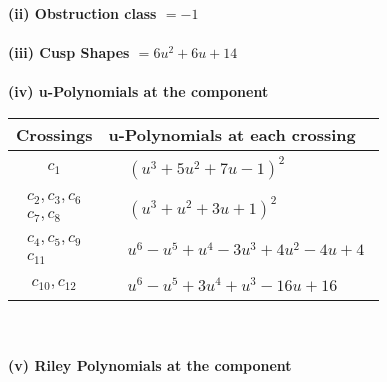 \documentclass[1p]{elsarticle_modified}
\theoremstyle{definition}
\begin{document}
\flushleft \textbf{(ii) Obstruction class $= -1$}\\~\\
\flushleft \textbf{(iii) Cusp Shapes $= 6 u^2+6 u+14$}\\~\\
\newpage\renewcommand{\arraystretch}{1}
\flushleft \textbf{(iv) u-Polynomials at the component}\newline \\
\begin{tabular}{m{50pt}|m{274pt}}
Crossings & \hspace{64pt}u-Polynomials at each crossing \\
\hline $$\begin{aligned}c_{1}\end{aligned}$$&$\begin{aligned}
&(u^3+5 u^2+7 u-1)^2
\end{aligned}$\\
\hline $$\begin{aligned}c_{2},c_{3},c_{6}\\c_{7},c_{8}\end{aligned}$$&$\begin{aligned}
&(u^3+u^2+3 u+1)^2
\end{aligned}$\\
\hline $$\begin{aligned}c_{4},c_{5},c_{9}\\c_{11}\end{aligned}$$&$\begin{aligned}
&u^6- u^5+u^4-3 u^3+4 u^2-4 u+4
\end{aligned}$\\
\hline $$\begin{aligned}c_{10},c_{12}\end{aligned}$$&$\begin{aligned}
&u^6- u^5+3 u^4+u^3-16 u+16
\end{aligned}$\\
\hline
\end{tabular}\\~\\
\newpage\renewcommand{\arraystretch}{1}
\flushleft \textbf{(v) Riley Polynomials at the component}\newline \\
\end{document}
